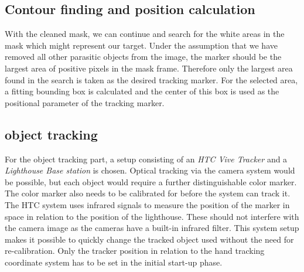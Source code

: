 \subsection{Contour finding and position calculation}
With the cleaned mask, we can continue and search for the white areas in the mask which might represent our target. Under the assumption that we have removed all other parasitic objects from the image, the marker should be the largest area of positive pixels in the mask frame. Therefore only the largest area found in the search is taken as the desired tracking marker. For the selected area, a fitting bounding box is calculated and the center of this box is used as the positional parameter of the tracking marker.
\subsection{object tracking}
For the object tracking part, a setup consisting of an \textit{HTC Vive Tracker} and a \textit{Lighthouse Base station} is chosen. Optical tracking via the camera system would be possible, but each object would require a further distinguishable color marker. The color marker also needs to be calibrated for before the system can track it. The HTC system uses infrared signals to measure the position of the marker in space in relation to the position of the lighthouse. These should not interfere with the camera image as the cameras have a built-in infrared filter. This system setup makes it possible to quickly change the tracked object used without the need for re-calibration. Only the tracker position in relation to the hand tracking coordinate system has to be set in the initial start-up phase.  
